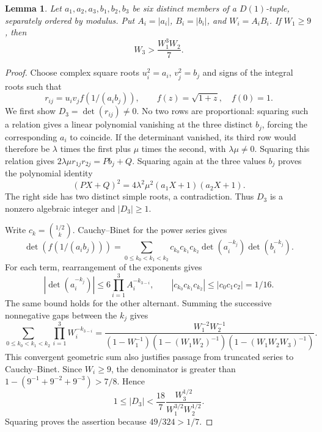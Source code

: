 \documentclass[12pt]{article}
\newtheorem{lemma}[theorem]{Lemma}
\numberwithin{equation}{section}
\begin{document}
\begin{lemma}\label{sm:crossblock}
Let $a_1,a_2,a_3,b_1,b_2,b_3$ be six distinct members of a
$D(1)$-tuple, separately ordered by modulus. Put
$A_i=|a_i|$, $B_i=|b_i|$, and $W_i=A_iB_i$.
If $W_1\ge9$, then
\[
 W_3>\frac{W_1^3W_2}{7}.
\]
\end{lemma}
\begin{proof}
Choose complex square roots $u_i^2=a_i$, $v_j^2=b_j$ and signs
of the integral roots such that
\[
 r_{ij}=u_iv_j f(1/(a_i b_j)),\qquad f(z)=\sqrt{1+z},\quad f(0)=1.
\]
We first show $D_3=\det(r_{ij})\ne0$. No two rows are proportional:
squaring such a relation gives a linear polynomial vanishing at the
three distinct $b_j$, forcing the corresponding $a_i$ to coincide.
If the determinant vanished, its third row would therefore be
$\lambda$ times the first plus $\mu$ times the second, with
$\lambda\mu\ne0$. Squaring this relation gives
$2\lambda\mu r_{1j}r_{2j}=Pb_j+Q$. Squaring again at the three
values $b_j$ proves the polynomial identity
\[
 (PX+Q)^2=4\lambda^2\mu^2(a_1X+1)(a_2X+1).
\]
The right side has two distinct simple roots, a contradiction.
Thus $D_3$ is a nonzero algebraic integer and $|D_3|\ge1$.

Write $c_k=\binom{1/2}{k}$. Cauchy--Binet for the power series gives
\[
 \det(f(1/(a_i b_j)))=
 \sum_{0\le k_0<k_1<k_2}
  c_{k_0}c_{k_1}c_{k_2}
  \det(a_i^{-k_j})\det(b_i^{-k_j}).
\]
For each term, rearrangement of the exponents gives
\[
 |\det(a_i^{-k_j})|\le6\prod_{i=1}^3A_i^{-k_{3-i}},
 \qquad |c_{k_0}c_{k_1}c_{k_2}|\le|c_0c_1c_2|=1/16.
\]
The same bound holds for the other alternant. Summing the successive
nonnegative gaps between the $k_j$ gives
\[
 \sum_{0\le k_0<k_1<k_2}\prod_{i=1}^3W_i^{-k_{3-i}}
 =\frac{W_1^{-2}W_2^{-1}}
 {(1-W_1^{-1})(1-(W_1W_2)^{-1})(1-(W_1W_2W_3)^{-1})}.
\]
This convergent geometric sum also justifies passage from truncated
series to Cauchy--Binet. Since $W_i\ge9$, the denominator is greater
than $1-(9^{-1}+9^{-2}+9^{-3})>7/8$. Hence
\[
 1\le|D_3|<\frac{18}{7}\frac{W_3^{1/2}}{W_1^{3/2}W_2^{1/2}}.
\]
Squaring proves the assertion because $49/324>1/7$.
\end{proof}
\end{document}
